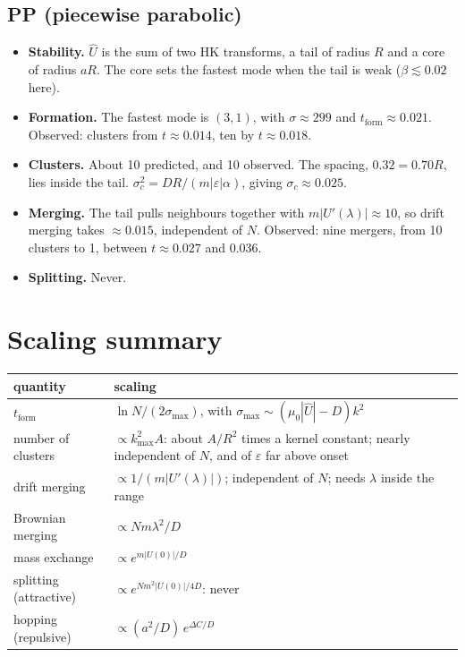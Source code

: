 \documentclass[11pt]{article}
\newcommand{\Uh}{\hat U}
\newcommand{\tf}{t_{\mathrm{form}}}
\begin{document}
\subsection{PP (piecewise parabolic)}
\begin{itemize}
  \item \textbf{Stability.} $\Uh$ is the sum of two HK transforms, a tail of
        radius $R$ and a core of radius $aR$. The core sets the fastest mode
        when the tail is weak ($\beta\lesssim0.02$ here).
  \item \textbf{Formation.} The fastest mode is $(3,1)$, with
        $\sigma\approx299$ and $\tf\approx0.021$. Observed: clusters from
        $t\approx0.014$, ten by $t\approx0.018$.
  \item \textbf{Clusters.} About 10 predicted, and 10 observed. The spacing,
        $0.32=0.70R$, lies inside the tail.
        $\sigma_c^2=DR/(m|\varepsilon|\alpha)$, giving $\sigma_c\approx0.025$.
  \item \textbf{Merging.} The tail pulls neighbours together with
        $m|U'(\lambda)|\approx10$, so drift merging takes $\approx0.015$,
        independent of $N$. Observed: nine mergers, from 10 clusters to 1,
        between $t\approx0.027$ and $0.036$.
  \item \textbf{Splitting.} Never.
\end{itemize}

\section{Scaling summary}
\begin{center}
\begin{tabularx}{\textwidth}{@{}l L@{}}
\toprule
quantity & scaling \\
\midrule
$\tf$ & $\ln N/(2\sigma_{\max})$, with $\sigma_{\max}\sim(\mu_0|\Uh|-D)k^2$ \\
number of clusters & $\propto k_{\max}^2A$: about $A/R^2$ times a kernel constant; nearly independent of $N$, and of $\varepsilon$ far above onset \\
drift merging & $\propto1/(m|U'(\lambda)|)$; independent of $N$; needs $\lambda$ inside the range \\
Brownian merging & $\propto Nm\lambda^2/D$ \\
mass exchange & $\propto e^{m|U(0)|/D}$ \\
splitting (attractive) & $\propto e^{Nm^2|U(0)|/4D}$: never \\
hopping (repulsive) & $\propto(a^2/D)\,e^{\Delta C/D}$ \\
\bottomrule
\end{tabularx}
\end{center}
\end{document}
